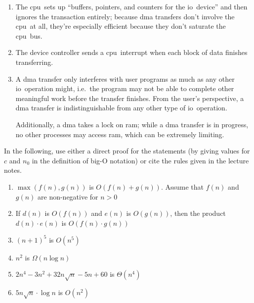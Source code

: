 \documentclass[gantt, scheme]{brandeis-problemset}
\newcommand{\io}{\ac{io}}
\newcommand{\cpu}{\ac{cpu}}
\begin{document}
\begin{enumerate}
	\item The \cpu\ sets up ``buffers, pointers, and counters for the
		\io\ device'' and then ignores the transaction entirely;
		because \ac{dma} transfers don't involve the \cpu\ at all,
		they're especially efficient because they don't saturate the
		\cpu\ bus.
	\item The device controller sends a \cpu\ interrupt when each block of
		data finishes transferring.
	\item A \ac{dma} transfer only interferes with user programs as much
		as any other \io\ operation might, i.e.\ the program may not
		be able to complete other meaningful work before the
		transfer finishes. From the user's perspective, a \ac{dma}
		transfer is indistinguishable from any other type of \io\
		operation.

		Additionally, a \ac{dma} takes a lock on \ac{ram}; while a
		\ac{dma} transfer is in progress, no other processes may
		access \ac{ram}, which can be extremely limiting.
\end{enumerate}

\begin{problem}
	In the following, use either a direct proof for the statements (by
	giving values for $c$ and $n_0$ in the definition of big-O notation)
	or cite the rules given in the lecture notes.

	\begin{enumerate}
		\item $\max(f(n), g(n))$ is $O(f(n) + g(n))$. Assume that $f(n)$
			and $g(n)$ are non-negative for $n > 0$
		\item  If $d(n)$ is $O(f(n))$ and $e(n)$ is $O(g(n))$, then
			the product $d(n) \cdot e(n)$ is $O(f(n) \cdot g(n))$
		\item $(n + 1)^5$ is $O(n^5)$
		\item $n^2$ is $\Omega(n\log n)$
		\item $2n^4 - 3n^2 + 32n\sqrt n - 5n + 60$ is $\Theta(n^4)$
		\item $5n\sqrt n \cdot \log n$ is $O(n^2)$
	\end{enumerate}
\end{problem}
\end{document}
